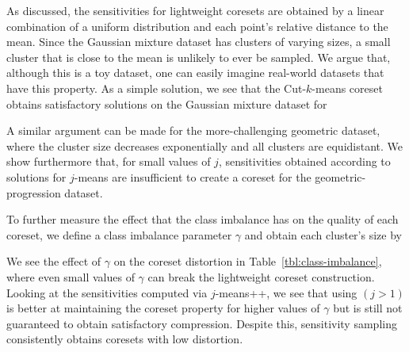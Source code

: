 
As discussed, the sensitivities for lightweight coresets are obtained by a linear combination of a uniform distribution and each point's relative
distance to the mean. Since the Gaussian mixture dataset has clusters of varying sizes, a small cluster that is close to the mean is unlikely
to ever be sampled. We argue that, although this is a toy dataset, one can easily imagine real-world datasets that have this property. 
As a simple solution, we see that the Cut-$k$-means coreset obtains satisfactory solutions on the Gaussian mixture dataset for 

A similar argument can be made for the more-challenging geometric dataset, where the cluster size decreases exponentially and all clusters are equidistant.
We show furthermore that, for small values of $j$, sensitivities obtained according to
solutions for $j$-means are insufficient to create a coreset for the geometric-progression dataset.

To further measure the effect that the class imbalance has on the quality of each coreset, we define a class imbalance parameter $\gamma$ and obtain each
cluster's size by 


We see the effect of $\gamma$ on the coreset distortion in Table~\ref{tbl:class-imbalance}, where even
small values of $\gamma$ can break the lightweight coreset construction.   Looking at the sensitivities computed via $j$-means++, we see that using $(j>1)$ is better at maintaining the coreset
property for higher values of $\gamma$ but is still not guaranteed to obtain satisfactory compression. Despite this, sensitivity sampling consistently obtains
coresets with low distortion.

